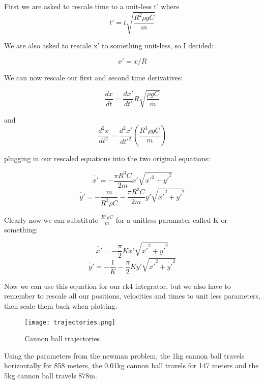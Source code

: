 \documentclass{article}
\begin{document}
First we are asked to rescale time to a unit-less t' where 
\begin{equation}
    t'=t \sqrt{\frac{R^2 \rho g C}{m}}
\end{equation}

We are also asked to rescale x' to something unit-less, so I decided:

\begin{equation}
    x'=x/R
\end{equation}

We can now rescale our first and second time derivatives:

\begin{equation}
    \frac{dx}{dt}=\frac{dx'}{dt'}R\sqrt{\frac{\rho g C}{m}}
\end{equation}

and
\begin{equation}
    \frac{d^2x}{dt^2}=\frac{d^2x'}{dt'^2}(\frac{R^3 \rho g C}{m})
\end{equation}


plugging in our rescaled equations into the two original equations:

\begin{equation}
    \ddot{x'}=-\frac{\pi R^3 C}{2m}\dot{x'}\sqrt{\dot{x'^2}+\dot{y'}^2}
\end{equation}
\begin{equation}
    \ddot{y'}=-\frac{m}{R^3 \rho C}-\frac{\pi R^3 C}{2m}\dot{y'}\sqrt{\dot{x'}^2+\dot{y'}^2}
\end{equation}

Clearly now we can substitute $\frac{R^3 \rho C}{m}$ for a  unitless paramater called K or something:

\begin{equation}
    \ddot{x'}=-\frac{\pi}{2}K\dot{x'}\sqrt{\dot{x'}^2+\dot{y'}^2}
\end{equation}
\begin{equation}
    \ddot{y'}=-\frac{1}{K}-\frac{\pi}{2}K\dot{y'}\sqrt{\dot{x'}^2+\dot{y'}^2}
\end{equation}


Now we can use this equation for our rk4 integrator, but we also have to remember to rescale all our positions, velocities and times to unit less parameters, then scale them back when plotting. 

\begin{figure}
    \centering
    \texttt{[image: trajectories.png]}
    \caption{Cannon ball trajectories}
    \label{fig:enter-label}
\end{figure}
Using the parameters from the newman problem, the 1kg cannon ball travels horizontally for 858 meters, the 0.01kg cannon ball travels for 147 meters and the 5kg cannon ball travels 878m.
\end{document}
